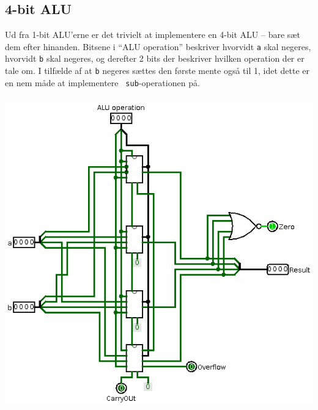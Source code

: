 \subsection{4-bit ALU}
Ud fra 1-bit ALU'erne er det trivielt at implementere en 4-bit ALU -- bare sæt
dem efter hinanden. Bitsene i ``ALU operation'' beskriver hvorvidt {\tt a} skal
negeres, hvorvidt {\tt b} skal negeres, og derefter 2 bits der beskriver hvilken
operation der er tale om. I tilfælde af at {\tt b} negeres sættes den første
mente også til 1, idet dette er en nem måde at implementere {\tt
sub}-operationen på. \\
\\
\includegraphics[scale=0.9]{Billeder/4bit-ALU.png}
